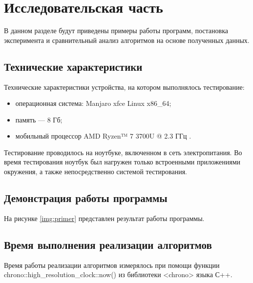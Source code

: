 \chapter{Исследовательская часть}

В данном разделе будут приведены примеры работы программ, постановка эксперимента и сравнительный анализ алгоритмов на основе полученных данных.

\section{Технические характеристики}

Технические характеристики устройства, на котором выполнялось тестирование:

\begin{itemize}
	\item операционная система: Manjaro xfce \cite{ubuntu} Linux \cite{linux} x86\_64;
	\item память --- 8 Гб;
	\item мобильный процессор AMD Ryzen™ 7 3700U @ 2.3 ГГц \cite{intel}.
\end{itemize}

Тестирование проводилось на ноутбуке, включенном в сеть электропитания. Во время тестирования ноутбук был нагружен только встроенными приложениями окружения, а также непосредственно системой тестирования.

\section{Демонстрация работы программы}

На рисунке \ref{img:primer} представлен результат работы программы.

\FloatBarrier

\section{Время выполнения реализации алгоритмов}

Время работы реализации алгоритмов измерялось при помощи функции chrono::high\_resolution\_clock::now() из библиотеки <chrono> языка С++.

